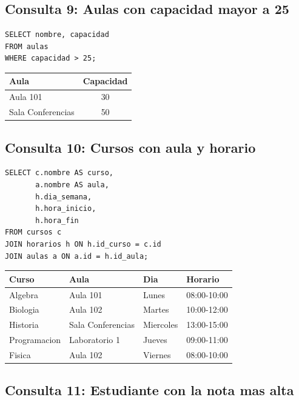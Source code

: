 \documentclass[12pt,a4paper]{article}
\begin{document}
\subsection{Consulta 9: Aulas con capacidad mayor a 25}

\begin{lstlisting}
SELECT nombre, capacidad
FROM aulas
WHERE capacidad > 25;
\end{lstlisting}

\begin{center}
\begin{tabular}{|l|c|}
\hline
Aula & Capacidad \\
\hline
Aula 101 & 30 \\
Sala Conferencias & 50 \\
\hline
\end{tabular}
\end{center}


\subsection{Consulta 10: Cursos con aula y horario}

\begin{lstlisting}
SELECT c.nombre AS curso,
       a.nombre AS aula,
       h.dia_semana,
       h.hora_inicio,
       h.hora_fin
FROM cursos c
JOIN horarios h ON h.id_curso = c.id
JOIN aulas a ON a.id = h.id_aula;
\end{lstlisting}

\begin{center}
\begin{tabular}{|l|l|l|l|}
\hline
Curso & Aula & Dia & Horario \\
\hline
Algebra & Aula 101 & Lunes & 08:00-10:00 \\
Biologia & Aula 102 & Martes & 10:00-12:00 \\
Historia & Sala Conferencias & Miercoles & 13:00-15:00 \\
Programacion & Laboratorio 1 & Jueves & 09:00-11:00 \\
Fisica & Aula 102 & Viernes & 08:00-10:00 \\
\hline
\end{tabular}
\end{center}


\subsection{Consulta 11: Estudiante con la nota mas alta}
\end{document}
